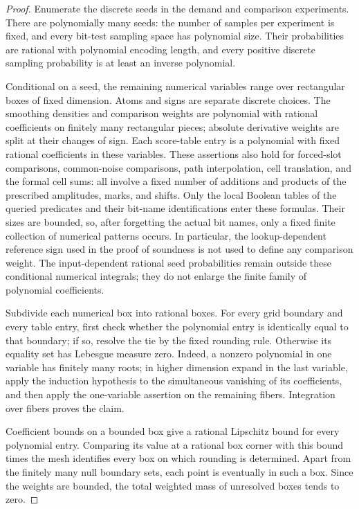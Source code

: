 \begin{proof}
Enumerate the discrete seeds in the demand and comparison experiments.
There are polynomially many seeds: the number of samples per experiment is
fixed, and every bit-test sampling space has polynomial size.  Their
probabilities are rational with polynomial encoding length, and every
positive discrete sampling probability is at least an inverse polynomial.

Conditional on a seed, the remaining numerical variables range over
rectangular boxes of fixed dimension.  Atoms and signs are separate discrete
choices.  The smoothing densities and comparison weights are polynomial
with rational coefficients on finitely many rectangular pieces; absolute
derivative weights are split at their changes of sign.  Each score-table
entry is a polynomial with fixed rational coefficients in these variables.
These assertions also hold for forced-slot comparisons, common-noise
comparisons, path interpolation, cell translation, and the formal cell sums:
all involve a fixed number of additions and products of the prescribed
amplitudes, marks, and shifts.  Only the local Boolean tables of the queried
predicates and their bit-name identifications enter these formulas.  Their
sizes are bounded, so, after forgetting the actual bit names, only a fixed
finite collection of numerical patterns occurs.  In particular, the
lookup-dependent reference sign used in the proof of soundness is not used
to define any comparison weight. The input-dependent rational seed
probabilities remain outside these conditional numerical integrals;
they do not enlarge the finite family of polynomial coefficients.

Subdivide each numerical box into rational boxes.  For every grid boundary
and every table entry, first check whether the polynomial entry is
identically equal to that boundary; if so, resolve the tie by the fixed
rounding rule.  Otherwise its equality set has Lebesgue measure zero.
Indeed, a nonzero polynomial in one variable has finitely many roots; in
higher dimension expand in the last variable, apply the induction
hypothesis to the simultaneous vanishing of its coefficients, and then
apply the one-variable assertion on the remaining fibers.  Integration
over fibers proves the claim.

Coefficient bounds on a bounded box give a rational Lipschitz bound for
every polynomial entry.  Comparing its value at a rational box corner
with this bound times the mesh identifies every box on which rounding
is determined.  Apart from the finitely many null boundary sets, each
point is eventually in such a box.  Since the weights are bounded, the
total weighted mass of unresolved boxes tends to zero.


\end{proof}
